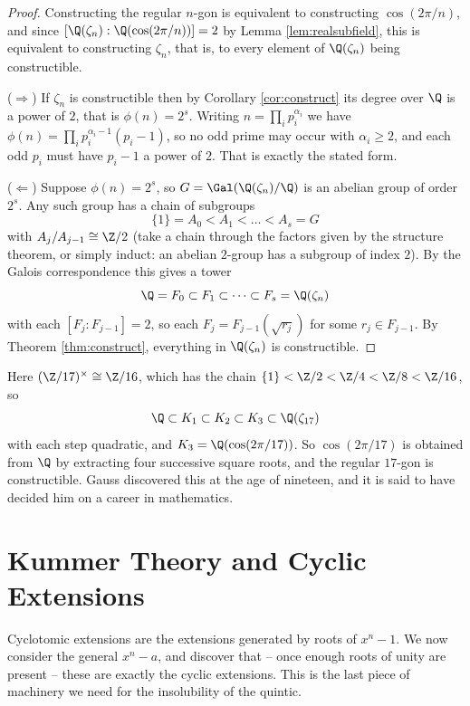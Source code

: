 \begin{proof}
	Constructing the regular $n$-gon is equivalent to constructing $\cos(2\pi/n)$, and since $[\Q(\zeta_n) : \Q(\cos(2\pi/n))] = 2$ by Lemma \ref{lem:realsubfield}, this is equivalent to constructing $\zeta_n$, that is, to every element of $\Q(\zeta_n)$ being constructible.

	($\Rightarrow$) If $\zeta_n$ is constructible then by Corollary \ref{cor:construct} its degree over $\Q$ is a power of $2$, that is $\phi(n) = 2^s$. Writing $n = \prod_i p_i^{\alpha_i}$ we have $\phi(n) = \prod_i p_i^{\alpha_i-1}(p_i-1)$, so no odd prime may occur with $\alpha_i \geq 2$, and each odd $p_i$ must have $p_i - 1$ a power of $2$. That is exactly the stated form.

	($\Leftarrow$) Suppose $\phi(n) = 2^s$, so $G = \Gal(\Q(\zeta_n)/\Q)$ is an abelian group of order $2^s$. Any such group has a chain of subgroups
	$$\{1\} = A_0 < A_1 < \dots < A_s = G$$
	with $A_{j}/A_{j-1}\cong \Z/2$ (take a chain through the factors given by the structure theorem, or simply induct: an abelian $2$-group has a subgroup of index $2$). By the Galois correspondence this gives a tower
	$$\Q = F_0 \subset F_1 \subset \dots \subset F_s = \Q(\zeta_n)$$
	with each $[F_j : F_{j-1}] = 2$, so each $F_j = F_{j-1}(\sqrt{r_j})$ for some $r_j \in F_{j-1}$. By Theorem \ref{thm:construct}, everything in $\Q(\zeta_n)$ is constructible.
\end{proof}

\begin{example}
	Here $(\Z/17)^\times \cong \Z/16$, which has the chain $\{1\} < \Z/2 < \Z/4 < \Z/8 < \Z/16$, so
	$$\Q \subset K_1 \subset K_2 \subset K_3 \subset \Q(\zeta_{17})$$
	with each step quadratic, and $K_3 = \Q(\cos(2\pi/17))$. So $\cos(2\pi/17)$ is obtained from $\Q$ by extracting four successive square roots, and the regular $17$-gon is constructible. Gauss discovered this at the age of nineteen, and it is said to have decided him on a career in mathematics.
\end{example}

\section{Kummer Theory and Cyclic Extensions}\label{sec:kummer}

Cyclotomic extensions are the extensions generated by roots of $x^n-1$. We now consider the general $x^n - a$, and discover that -- once enough roots of unity are present -- these are exactly the cyclic extensions. This is the last piece of machinery we need for the insolubility of the quintic.


